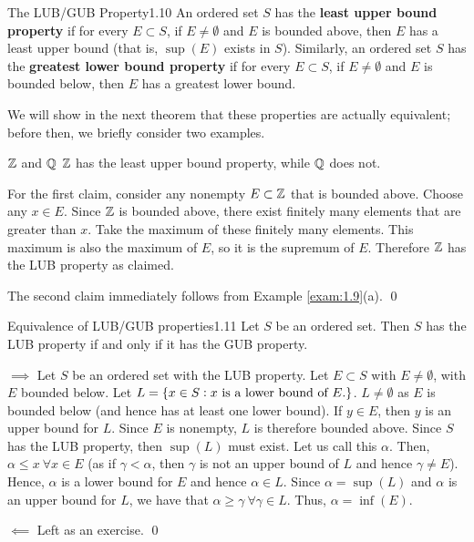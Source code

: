 \begin{definition}{The LUB/GUB Property}{1.10}
    An ordered set $S$ has the \textbf{least upper bound property} if for every $E \subset S$, if $E \neq \emptyset$ and $E$ is bounded above, then $E$ has a least upper bound (that is, $\sup(E)$ exists in $S$). Similarly, an ordered set $S$ has the \textbf{greatest lower bound property} if for every $E \subset S$, if $E \neq \emptyset$ and $E$ is bounded below, then $E$ has a greatest lower bound.
\end{definition}
\noindent We will show in the next theorem that these properties are actually equivalent; before then, we briefly consider two examples.
\begin{nexample}{$\mathbb{Z}$ and $\mathbb{Q}$}
    $\mathbb{Z}$ has the least upper bound property, while $\mathbb{Q}$ does not. 
\end{nexample}
\begin{nproof}
    For the first claim, consider any nonempty $E \subset \mathbb{Z}$ that is bounded above. Choose any $x \in E$. Since $\mathbb{Z}$ is bounded above, there exist finitely many elements that are greater than $x$. Take the maximum of these finitely many elements. This maximum is also the maximum of $E$, so it is the supremum of $E$. Therefore $\mathbb{Z}$ has the LUB property as claimed.
    
    The second claim immediately follows from Example \ref{exam:1.9}(a). \qed
\end{nproof}

\begin{theorem}{Equivalence of LUB/GUB properties}{1.11}
    Let $S$ be an ordered set. Then $S$ has the LUB property if and only if it has the GUB property. 
\end{theorem}
\begin{nproof}
    $\boxed{\implies}$ Let $S$ be an ordered set with the LUB property. Let $E \subset S$ with $E \neq \emptyset$, with $E$ bounded below. Let $L = \set{x \in S: x\text{ is a lower bound of $E$.}}$. $L \neq \emptyset$ as $E$ is bounded below (and hence has at least one lower bound). If $y \in E$, then $y$ is an upper bound for $L$. Since $E$ is nonempty, $L$ is therefore bounded above. Since $S$ has the LUB property, then $\sup(L)$ must exist. Let us call this $\alpha$. Then, $\alpha \leq x\ \forall x \in E$ (as if $\gamma < \alpha$, then $\gamma$ is not an upper bound of $L$ and hence $\gamma \neq E$). Hence, $\alpha$ is a lower bound for $E$ and hence $\alpha \in L$. Since $\alpha = \sup(L)$ and $\alpha$ is an upper bound for $L$, we have that $\alpha \geq \gamma\ \forall \gamma \in L$. Thus, $\alpha = \inf(E)$. 

    $\boxed{\impliedby}$ Left as an exercise. \qed
\end{nproof}

